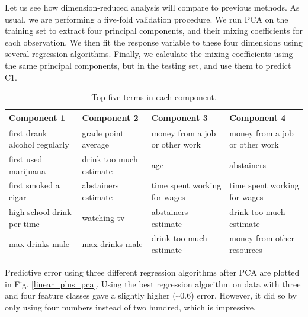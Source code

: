 Let us see how dimension-reduced analysis will compare to previous methods. As usual, we are performing a five-fold validation procedure. We run PCA on the training set to extract four principal components, and their mixing coefficients for each observation. We then fit the response variable to these four dimensions using several regression algorithms. Finally, we calculate the mixing coefficients using the same principal components, but in the testing set, and use them to predict C1. 


\begin{center}
\begin{table}[ht]
\begin{tabular}{l l l l}
\hline \hline
Component 1 & Component 2 &Component 3&Component 4\\ \hline 
first drank alcohol regularly &		grade point average		&money from a job or other work&money from a job or other work\\
first used marijuana  &		drink too much estimate	&age					&	abstainers\\
first smoked a cigar&		abstainers estimate		&time spent working for wages	&time spent working for wages\\
high school-drink per time&watching tv			&abstainers estimate		&drink too much estimate\\
max drinks male&		max drinks male		&drink too much estimate		&money from other resources\\
\hline
\end{tabular}
\caption{Top five terms in each component.}
\label{components}
\end{table}
\end{center}

Predictive error using three different regression algorithms after PCA are plotted in Fig. \ref{linear_plus_pca}. Using the best regression algorithm on data with three and four feature classes gave a slightly higher (\textasciitilde 0.6) error. However, it did so by only using four numbers instead of two hundred, which is impressive.

